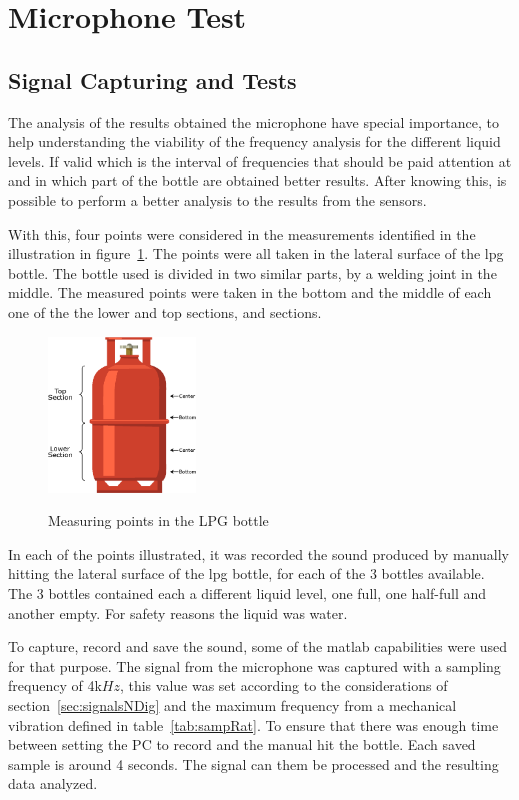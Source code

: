 \section{Microphone Test}\label{sec:MicroTests}
\subsection{Signal Capturing and Tests}
The analysis of the results obtained the microphone have special importance, to help understanding the viability of the frequency analysis  for the different liquid levels. If valid which is the interval of frequencies that should be paid attention at and in which part of the bottle are obtained better results. After knowing this, is possible to perform a better analysis to the results from the sensors.

With this, four points were considered in the measurements identified in the illustration in figure~\ref{fig:measPointMic}. The points were all taken in the lateral surface of the \acrshort{lpg} bottle. The bottle used is divided in two similar parts, by a welding joint in the middle. The measured points were taken in the bottom and the middle of each one of the the lower and top sections, and sections. 
\begin{figure}[]
    \centering
    \includegraphics[width=0.35\textwidth]{Chapters/6CHP/Figures/measuringPointsMic.eps}
    \caption{Measuring points in the LPG bottle}{}
    \label{fig:measPointMic}
\end{figure}
In each of the points illustrated, it was recorded the sound produced by manually hitting the lateral surface of the \acrshort{lpg} bottle, for each of the 3 bottles available. The 3 bottles contained each a different liquid level, one full, one half-full and another empty. For safety reasons the liquid was water.

To capture, record and save the sound, some of the \acrshort{matlab} capabilities were used for that purpose. The signal from the microphone was captured with a sampling frequency of 4k$Hz$, this value was set according to the considerations of section~\ref{sec:signalsNDig} and the maximum frequency from a mechanical vibration defined in table~\ref{tab:sampRat}. To ensure that there was enough time between setting the PC to record and the manual hit the bottle. Each saved sample is around 4 seconds. The signal can them be processed and the resulting data analyzed.

